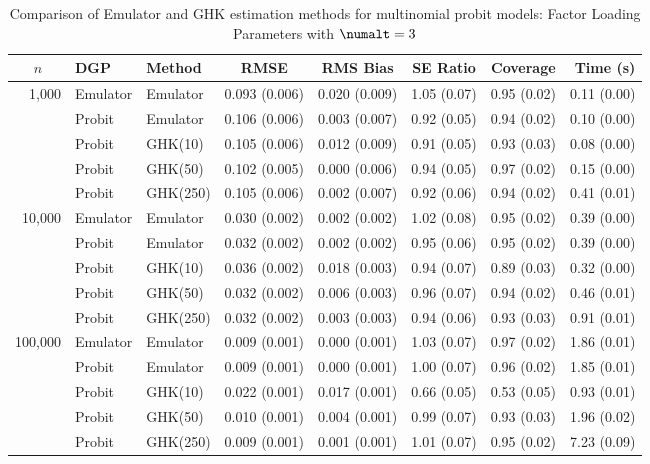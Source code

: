 \begin{table}[htbp]
\centering
\footnotesize
\begin{tabular}{@{}rllrrrrr@{}}
\toprule
\multicolumn{1}{c}{$n$} & \multicolumn{1}{l}{DGP} & \multicolumn{1}{l}{Method} & \multicolumn{1}{c}{RMSE} & \multicolumn{1}{c}{RMS Bias} & \multicolumn{1}{c}{SE Ratio} & \multicolumn{1}{c}{Coverage} & \multicolumn{1}{r}{Time (s)} \\
\midrule
\multirow{5}{*}{1,000} & Emulator & Emulator & 0.093 (0.006) & 0.020 (0.009) & 1.05 (0.07) & 0.95 (0.02) & 0.11 (0.00) \\
 & Probit & Emulator & 0.106 (0.006) & 0.003 (0.007) & 0.92 (0.05) & 0.94 (0.02) & 0.10 (0.00) \\
 & Probit & GHK(10) & 0.105 (0.006) & 0.012 (0.009) & 0.91 (0.05) & 0.93 (0.03) & 0.08 (0.00) \\
 & Probit & GHK(50) & 0.102 (0.005) & 0.000 (0.006) & 0.94 (0.05) & 0.97 (0.02) & 0.15 (0.00) \\
 & Probit & GHK(250) & 0.105 (0.006) & 0.002 (0.007) & 0.92 (0.06) & 0.94 (0.02) & 0.41 (0.01) \\
\midrule
\multirow{5}{*}{10,000} & Emulator & Emulator & 0.030 (0.002) & 0.002 (0.002) & 1.02 (0.08) & 0.95 (0.02) & 0.39 (0.00) \\
 & Probit & Emulator & 0.032 (0.002) & 0.002 (0.002) & 0.95 (0.06) & 0.95 (0.02) & 0.39 (0.00) \\
 & Probit & GHK(10) & 0.036 (0.002) & 0.018 (0.003) & 0.94 (0.07) & 0.89 (0.03) & 0.32 (0.00) \\
 & Probit & GHK(50) & 0.032 (0.002) & 0.006 (0.003) & 0.96 (0.07) & 0.94 (0.02) & 0.46 (0.01) \\
 & Probit & GHK(250) & 0.032 (0.002) & 0.003 (0.003) & 0.94 (0.06) & 0.93 (0.03) & 0.91 (0.01) \\
\midrule
\multirow{5}{*}{100,000} & Emulator & Emulator & 0.009 (0.001) & 0.000 (0.001) & 1.03 (0.07) & 0.97 (0.02) & 1.86 (0.01) \\
 & Probit & Emulator & 0.009 (0.001) & 0.000 (0.001) & 1.00 (0.07) & 0.96 (0.02) & 1.85 (0.01) \\
 & Probit & GHK(10) & 0.022 (0.001) & 0.017 (0.001) & 0.66 (0.05) & 0.53 (0.05) & 0.93 (0.01) \\
 & Probit & GHK(50) & 0.010 (0.001) & 0.004 (0.001) & 0.99 (0.07) & 0.93 (0.03) & 1.96 (0.02) \\
 & Probit & GHK(250) & 0.009 (0.001) & 0.001 (0.001) & 1.01 (0.07) & 0.95 (0.02) & 7.23 (0.09) \\
\bottomrule
\end{tabular}
\caption{Comparison of Emulator and GHK estimation methods for multinomial probit models: Factor Loading Parameters with $\numalt=3$}
\label{tab:emulator_vs_ghk:3:gamma}
\end{table}